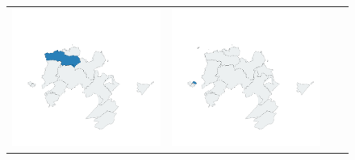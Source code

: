 \begin{figure}[p]
\begin{tabularx}{1\textwidth}{XXXX}
\includegraphics[width=1\linewidth]{images/ch6/loading/09}&
\includegraphics[width=1\linewidth]{images/ch6/loading/10}&

\end{tabularx}
\end{figure}
